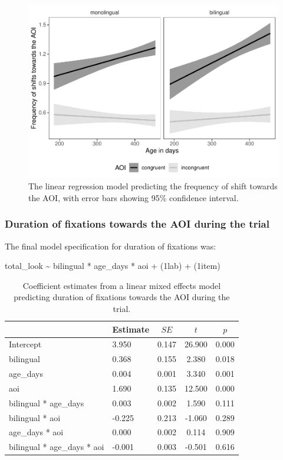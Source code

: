 \documentclass[,man,floatsintext]{apa6}
\begin{document}
\begin{figure}
\centering
\includegraphics{gaze-following-paper_files/figure-latex/fig7-1.pdf}
\caption{\label{fig:fig7}The linear regression model predicting the frequency of shift towards the AOI, with error bars showing 95\% confidence interval.}
\end{figure}

\hypertarget{duration-of-fixations-towards-the-aoi-during-the-trial}{%
\subsubsection{Duration of fixations towards the AOI during the trial}\label{duration-of-fixations-towards-the-aoi-during-the-trial}}

The final model specification for duration of fixations was:

total\_look \textasciitilde{} bilingual * age\_days * aoi +
(1\textbar{}lab) +
(1\textbar{}item)

\begin{table}[tbp]
\begin{center}
\begin{threeparttable}
\caption{\label{tab:coef_table_duration}Coefficient estimates from a linear mixed effects model predicting duration of fixations towards the AOI during the trial.}
\begin{tabular}{llccc}
\toprule
 & Estimate & $SE$ & $t$ & $p$\\
\midrule
Intercept & 3.950 & 0.147 & 26.900 & 0.000\\
bilingual & 0.368 & 0.155 & 2.380 & 0.018\\
age\_days & 0.004 & 0.001 & 3.340 & 0.001\\
aoi & 1.690 & 0.135 & 12.500 & 0.000\\
bilingual * age\_days & 0.003 & 0.002 & 1.590 & 0.111\\
bilingual * aoi & -0.225 & 0.213 & -1.060 & 0.289\\
age\_days * aoi & 0.000 & 0.002 & 0.114 & 0.909\\
bilingual * age\_days * aoi & -0.001 & 0.003 & -0.501 & 0.616\\
\bottomrule
\end{tabular}
\end{threeparttable}
\end{center}
\end{table}
\end{document}
